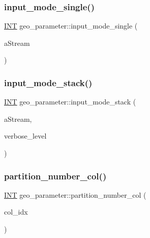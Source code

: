 \mbox{\label{classgeo__parameter_a235471052aff1633336000b385dfca78}} 
\subsubsection{\texorpdfstring{input\+\_\+mode\+\_\+single()}{input\_mode\_single()}}
{\footnotesize\ttfamily \mbox{\hyperlink{galois_8h_a09fddde158a3a20bd2dcadb609de11dc}{I\+NT}} geo\+\_\+parameter\+::input\+\_\+mode\+\_\+single (\begin{DoxyParamCaption}\item[{ifstream \&}]{a\+Stream }\end{DoxyParamCaption})}

\mbox{\label{classgeo__parameter_a10ec756948696ab11fafb5091c2d463e}} 
\subsubsection{\texorpdfstring{input\+\_\+mode\+\_\+stack()}{input\_mode\_stack()}}
{\footnotesize\ttfamily \mbox{\hyperlink{galois_8h_a09fddde158a3a20bd2dcadb609de11dc}{I\+NT}} geo\+\_\+parameter\+::input\+\_\+mode\+\_\+stack (\begin{DoxyParamCaption}\item[{ifstream \&}]{a\+Stream,  }\item[{\mbox{\hyperlink{galois_8h_a09fddde158a3a20bd2dcadb609de11dc}{I\+NT}}}]{verbose\+\_\+level }\end{DoxyParamCaption})}

\mbox{\label{classgeo__parameter_a4db5275b30ad1755f9e3c63e10b5eaa9}} 
\subsubsection{\texorpdfstring{partition\+\_\+number\+\_\+col()}{partition\_number\_col()}}
{\footnotesize\ttfamily \mbox{\hyperlink{galois_8h_a09fddde158a3a20bd2dcadb609de11dc}{I\+NT}} geo\+\_\+parameter\+::partition\+\_\+number\+\_\+col (\begin{DoxyParamCaption}\item[{\mbox{\hyperlink{galois_8h_a09fddde158a3a20bd2dcadb609de11dc}{I\+NT}}}]{col\+\_\+idx }\end{DoxyParamCaption})}

